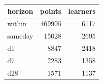 \begin{tabular}{lrr}
\toprule
horizon & points & learners \\
\midrule
within & 469905 & 6117 \\
sameday & 15028 & 2695 \\
d1 & 8847 & 2418 \\
d7 & 2283 & 1358 \\
d28 & 1571 & 1137 \\
\bottomrule
\end{tabular}
